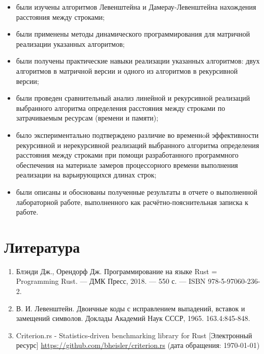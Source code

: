 \documentclass[14pt,russian]{scrartcl}
\newcommand{\anonsection}[1]{\cleardoublepage
\phantomsection
\addcontentsline{toc}{section}{\protect\numberline{}#1}
\section*{#1}\vspace*{2.5ex} %
}
\begin{document}
	\begin{itemize}
		\item были изучены алгоритмов Левенштейна и Дамерау-Левенштейна нахождения расстояния между строками;
		\item были применены методы динамического программирования для матричной реализации указанных алгоритмов;
		\item были получены практические навыки реализации указанных алгоритмов: двух алгоритмов в матричной версии и одного из алгоритмов в рекурсивной версии;
		\item были проведен сравнительный анализ линейной и рекурсивной реализаций выбранного алгоритма определения расстояния между строками по затрачиваемым ресурсам (времени и памяти);
		\item было экспериментально подтверждено различие во временнoй эффективности рекурсивной и нерекурсивной реализаций выбранного алгоритма определения расстояния между строками при помощи разработанного программного обеспечения на материале замеров процессорного времени выполнения реализации на варьирующихся длинах строк;
		\item были описаны и обоснованы полученные результаты в отчете о выполненной лабораторной работе, выполненного как расчётно-пояснительная записка к работе.
	\end{itemize}

	\anonsection{Литература}

	\begin{enumerate}
		\item Блэнди Дж., Орендорф Дж. Программирование на языке Rust = Programming Rust. — ДМК Пресс, 2018. — 550 с. — ISBN 978-5-97060-236-2.
		\item В. И. Левенштейн. Двоичные коды с исправлением выпадений, вставок и замещений символов. Доклады Академий Наук СССР, 1965. 163.4:845-848.
		\item Criterion.rs - Statistics-driven benchmarking library for Rust [Электронный ресурс] \url{https://github.com/bheisler/criterion.rs} (дата обращения: \today)
	\end{enumerate}
\end{document}
